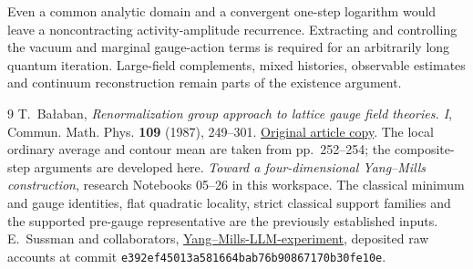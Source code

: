 \documentclass[11pt]{article}
\theoremstyle{remark}
\begin{document}
Even a common analytic domain and a convergent one-step logarithm
would leave a noncontracting activity-amplitude recurrence.
Extracting and controlling the vacuum and marginal gauge-action
terms is required for an arbitrarily long quantum iteration.
Large-field complements, mixed histories, observable estimates and
continuum reconstruction remain parts of the existence argument.

\begin{thebibliography}{9}
T.~Ba\l aban,
\emph{Renormalization group approach to lattice gauge field
theories. I},
Commun. Math. Phys. \textbf{109} (1987), 249--301.
\href{https://scispace.com/pdf/renormalization-group-approach-to-lattice-gauge-field-3ygai0vxt1.pdf}{Original article copy}.
The local ordinary average and contour mean are taken from
pp.~252--254; the composite-step arguments are developed here.
\emph{Toward a four-dimensional Yang--Mills construction},
research Notebooks 05--26 in this workspace.
The classical minimum and gauge identities, flat quadratic
locality, strict classical support families and the supported
pre-gauge representative are the previously established inputs.
E.~Sussman and collaborators,
\href{https://github.com/ethanwsussman/Yang--Mills-LLM-experiment}{Yang--Mills-LLM-experiment},
deposited raw accounts at commit
\texttt{e392ef45013a581664bab76b90867170b30fe10e}.
\end{thebibliography}
\end{document}

